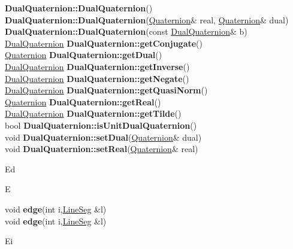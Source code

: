 \documentclass[10pt,titlepage]{article}
\def\functionlistentry#1#2#3#4#5#6{\noindent #1 {\bf #2}(#3) \dotfill #6\\}
\def\letterref#1{}
\def\letterlabel#1{\vspace{0.5cm}\centerline{\Large #1}}
\def\letterlabelend#1{}
\begin{document}
{{\letterref{De}
\letterref{Di}
\letterref{Do}
\letterref{Dr}
\letterref{Du}
\letterlabelend{Du}
\functionlistentry{}{DualQuaternion::DualQuaternion}{}{1513}{quaternions}{}
\functionlistentry{}{DualQuaternion::DualQuaternion}{\hyperlink{Quaternion}{Quaternion}\& real, \hyperlink{Quaternion}{Quaternion}\& dual}{1514}{quaternions}{}
\functionlistentry{}{DualQuaternion::DualQuaternion}{const \hyperlink{DualQuaternion}{DualQuaternion}\& b}{1515}{quaternions}{}
\functionlistentry{\hyperlink{DualQuaternion}{DualQuaternion}}{DualQuaternion::getConjugate}{}{1521}{quaternions}{}
\functionlistentry{\hyperlink{Quaternion}{Quaternion}}{DualQuaternion::getDual}{}{1517}{quaternions}{}
\functionlistentry{\hyperlink{DualQuaternion}{DualQuaternion}}{DualQuaternion::getInverse}{}{1523}{quaternions}{}
\functionlistentry{\hyperlink{DualQuaternion}{DualQuaternion}}{DualQuaternion::getNegate}{}{1520}{quaternions}{}
\functionlistentry{\hyperlink{DualQuaternion}{DualQuaternion}}{DualQuaternion::getQuasiNorm}{}{1524}{quaternions}{}
\functionlistentry{\hyperlink{Quaternion}{Quaternion}}{DualQuaternion::getReal}{}{1516}{quaternions}{}
\functionlistentry{\hyperlink{DualQuaternion}{DualQuaternion}}{DualQuaternion::getTilde}{}{1522}{quaternions}{}
\functionlistentry{bool}{DualQuaternion::isUnitDualQuaternion}{}{1525}{quaternions}{}
\functionlistentry{void}{DualQuaternion::setDual}{\hyperlink{Quaternion}{Quaternion}\& dual}{1519}{quaternions}{}
\functionlistentry{void}{DualQuaternion::setReal}{\hyperlink{Quaternion}{Quaternion}\& real}{1518}{quaternions}{}

\letterlabel{Ed}
\letterlabel{E}
\letterref{A}
\letterref{B}
\letterref{C}
\letterref{D}
\letterref{E}
\letterref{F}
\letterref{G}
\letterref{H}
\letterref{I}
\letterref{K}
\letterref{L}
\letterref{M}
\letterref{N}
\letterref{O}
\letterref{P}
\letterref{Q}
\letterref{R}
\letterref{S}
\letterref{T}
\letterref{U}
\letterref{V}
\letterref{W}
\letterref{X}
\letterref{Y}
\letterref{Z}

\letterref{Ed}
\letterref{Ei}
\letterref{El}
\letterref{Eq}
\letterref{Er}
\letterref{Es}
\letterlabelend{Ed}
\functionlistentry{void}{edge}{int i,\hyperlink{LineSeg}{LineSeg} \&l}{601}{geoObject}{}
\functionlistentry{void}{edge}{int i,\hyperlink{LineSeg}{LineSeg} \&l}{620}{geoObject}{}

\letterlabel{Ei}
\letterref{A}
\letterref{B}
\letterref{C}
\letterref{D}
\letterref{E}
\letterref{F}
\letterref{G}
\letterref{H}
\letterref{I}
\letterref{K}
\letterref{L}
\letterref{M}
\letterref{N}
\letterref{O}
\letterref{P}
\letterref{Q}
\letterref{R}
\letterref{S}
\letterref{T}
\letterref{U}
\letterref{V}
\letterref{W}
\letterref{X}
\letterref{Y}
\letterref{Z}

}}
\end{document}
